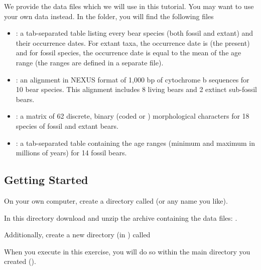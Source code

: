 We provide the data files which we will use in this tutorial.
You may want to use your own data instead.
In the  folder, you will find the following files
\begin{itemize}[noitemsep,topsep=0pt]
\item {}: a tab-separated table listing every bear species (both fossil and extant) and their occurrence dates. For extant taxa, the occurrence date is  (\IE the present) and for fossil species, the occurrence date is equal to the mean of the age range (the ranges are defined in a separate file).
\item {}: an alignment in NEXUS format of 1,000 bp of cytochrome b sequences for 10 bear species. This alignment includes 8 living bears and 2 extinct sub-fossil bears.
\item {}: a matrix of 62 discrete, binary (coded  or ) morphological characters for 18 species of fossil and extant bears.
\item {}: a tab-separated table containing the age ranges (minimum and maximum in millions of years) for 14 fossil bears.
\end{itemize}


\bigskip
\subsection{Getting Started}\label{subsect:RB-GetStart}

{\begin{framed}
On your own computer, create a directory called {\textcolor{red}{}} (or any name you like). 

In this directory download and unzip the archive containing the data files: \href{www.revbayes.com}{}.

Additionally, create a new directory (in ) called {\textcolor{red}{}}
\end{framed}}

When you execute \RevBayes in this exercise, you will do so within the main directory you created ().


